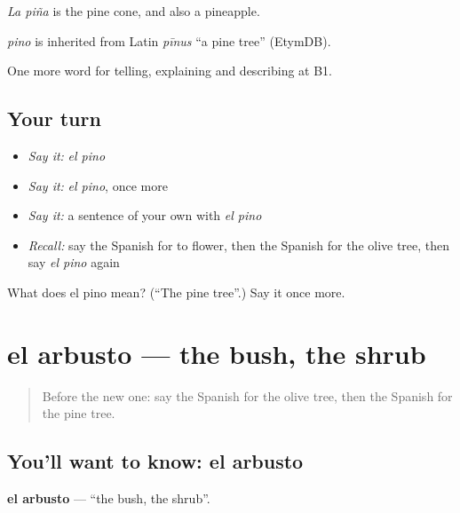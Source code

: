 \emph{La piña} is the pine cone, and also a pineapple.

\begin{cousinweb}
\emph{pino} is inherited from Latin \emph{pīnus} \textquotedblleft{}a pine tree\textquotedblright{} (EtymDB).
\end{cousinweb}

\begin{grammarlens}[title={What you've built}]
One more word for telling, explaining and describing at B1.
\end{grammarlens}

\subsection*{Your turn}
\begin{itemize}
\raggedright
  \item \emph{Say it:} \emph{el pino}
  \item \emph{Say it:} \emph{el pino}, once more
  \item \emph{Say it:} a sentence of your own with \emph{el pino}
  \item \emph{Recall:} say the Spanish for to flower, then the Spanish for the olive tree, then say \emph{el pino} again
\end{itemize}

\begin{tcolorbox}[breakable,colback=teal!4,colframe=teal!35!black,title={Before you move on}]
What does el pino mean? (\textquotedblleft{}The pine tree\textquotedblright{}.) Say it once more.
\end{tcolorbox}
\section[el arbusto]{el arbusto — the bush, the shrub}

\label{lesson:ES-C693-arbusto}



\begin{quote}
Before the new one: say the Spanish for the olive tree, then the Spanish for the pine tree.
\end{quote}

\subsection*{You'll want to know: el arbusto}
\textbf{el arbusto} — \textquotedblleft{}the bush, the shrub\textquotedblright{}.

